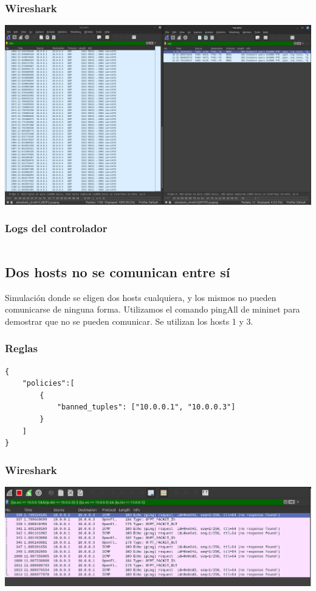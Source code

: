\documentclass{article}
\begin{document}
\subsubsection{Wireshark}
\begin{center}
\includegraphics[scale=0.2]{Multi_Rules_WS_.png}
\end{center}

\subsubsection{Logs del controlador}
\begin{center}
  \inputminted[fontsize=\footnotesize]{text}{informe/logs/Multi_Rules_WS.txt}
\end{center}

\subsection{Dos hosts no se comunican entre sí}
Simulación donde se eligen dos hosts cualquiera, y los mismos no pueden comunicarse de ninguna forma. Utilizamos el comando pingAll de mininet para demostrar que no se pueden comunicar. Se utilizan los hosts 1 y 3.

\subsubsection{Reglas}
\begin{verbatim}
{
    "policies":[
        {
            "banned_tuples": ["10.0.0.1", "10.0.0.3"]
        }
    ]
}
\end{verbatim}

\subsubsection{Wireshark}
\begin{center}
\includegraphics[scale=0.35]{Banned_Tuple_WS.png}
\end{center}
\end{document}
